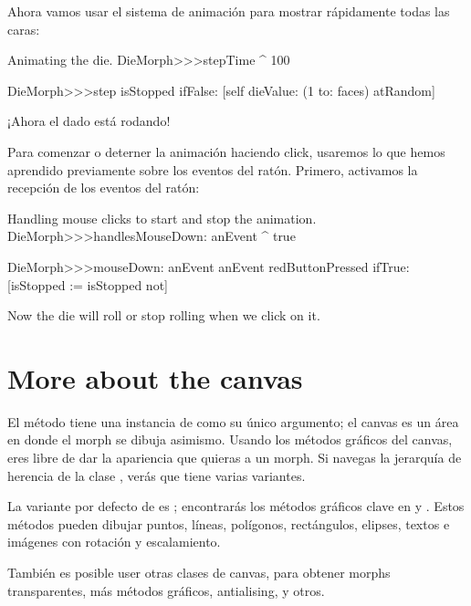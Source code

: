 \documentclass[a4paper,10pt,twoside]{book}
\begin{document}
Ahora vamos usar el sistema de animaci\'on para mostrar r\'apidamente todas las caras:
\begin{methods}{Animating the die.}
DieMorph>>>stepTime
	^ 100

DieMorph>>>step
	isStopped ifFalse: [self dieValue: (1 to: faces) atRandom]
\end{methods}
¡Ahora el dado est\'a rodando!

Para comenzar o deterner la animaci\'on haciendo click, usaremos lo que hemos aprendido previamente sobre los eventos del  rat\'on.
Primero, activamos la recepci\'on de los eventos del rat\'on:

\begin{methods}{Handling mouse clicks to start and stop the animation.}
DieMorph>>>handlesMouseDown: anEvent
	^ true

DieMorph>>>mouseDown: anEvent
	anEvent redButtonPressed
		ifTrue: [isStopped := isStopped not]
\end{methods}
Now the die will roll or stop rolling when we click on it.



\section{More about the canvas}

El método  tiene una instancia de  como su \'unico argumento;
el canvas es un \'area en donde el morph se dibuja asimismo.
Usando los m\'etodos gr\'aficos del canvas, eres libre de dar la apariencia que quieras a un morph.
Si navegas la jerarqu\'ia de herencia de la clase , ver\'as que tiene varias variantes.

La variante por defecto de  es ; encontrar\'as los m\'etodos gr\'aficos clave en  y .
Estos m\'etodos pueden dibujar puntos, l\'ineas, pol\'igonos, rect\'angulos, elipses, textos e im\'agenes con rotaci\'on y escalamiento.

Tambi\'en es posible user otras clases de canvas, para obtener morphs transparentes, m\'as m\'etodos gr\'aficos, antialising, y otros.
\end{document}
